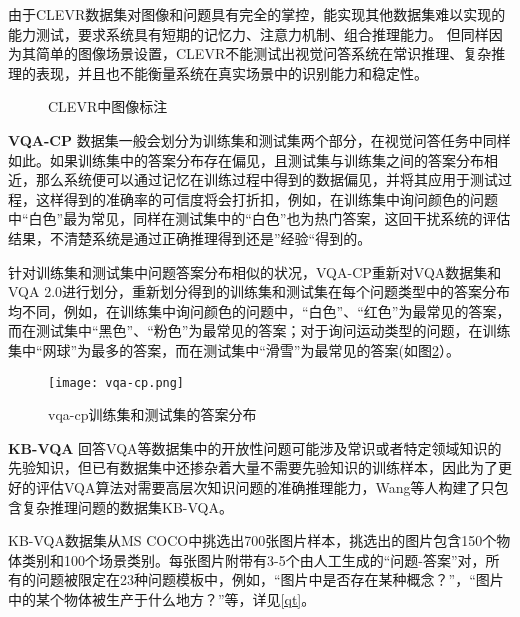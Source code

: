 由于CLEVR数据集对图像和问题具有完全的掌控，能实现其他数据集难以实现的能力测试，要求系统具有短期的记忆力、注意力机制、组合推理能力。
但同样因为其简单的图像场景设置，CLEVR不能测试出视觉问答系统在常识推理、复杂推理的表现，并且也不能衡量系统在真实场景中的识别能力和稳定性。
\begin{figure}[H]
	\centering
	\caption{CLEVR中图像标注}
	\label{clevr}
\end{figure}

\textbf{VQA-CP}
数据集一般会划分为训练集和测试集两个部分，在视觉问答任务中同样如此。如果训练集中的答案分布存在偏见，且测试集与训练集之间的答案分布相近，那么系统便可以通过记忆在训练过程中得到的数据偏见，并将其应用于测试过程，这样得到的准确率的可信度将会打折扣，例如，在训练集中询问颜色的问题中“白色”最为常见，同样在测试集中的“白色”也为热门答案，这回干扰系统的评估结果，不清楚系统是通过正确推理得到还是”经验“得到的。

针对训练集和测试集中问题答案分布相似的状况，VQA-CP重新对VQA数据集和VQA 2.0进行划分，重新划分得到的训练集和测试集在每个问题类型中的答案分布均不同，例如，在训练集中询问颜色的问题中，“白色”、“红色”为最常见的答案，而在测试集中“黑色”、“粉色”为最常见的答案；对于询问运动类型的问题，在训练集中“网球”为最多的答案，而在测试集中“滑雪”为最常见的答案(如图\ref{vqa-cp}）。
\begin{figure}[H]
	\centering
	\texttt{[image: vqa-cp.png]}
	\caption{vqa-cp训练集和测试集的答案分布}
	\label{vqa-cp}
\end{figure}

\textbf{KB-VQA}
回答VQA等数据集中的开放性问题可能涉及常识或者特定领域知识的先验知识，但已有数据集中还掺杂着大量不需要先验知识的训练样本，因此为了更好的评估VQA算法对需要高层次知识问题的准确推理能力，Wang等人构建了只包含复杂推理问题的数据集KB-VQA。

KB-VQA数据集从MS COCO中挑选出700张图片样本，挑选出的图片包含150个物体类别和100个场景类别。每张图片附带有3-5个由人工生成的“问题-答案”对，所有的问题被限定在23种问题模板中，例如，“图片中是否存在某种概念？”，“图片中的某个物体被生产于什么地方？”等，详见\ref{qt}。

